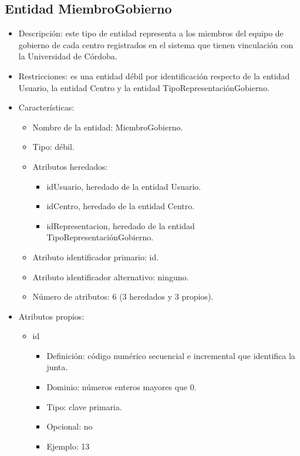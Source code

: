 \subsection{Entidad MiembroGobierno}
\begin{itemize}
    \item Descripción: este tipo de entidad representa a los miembros del equipo de gobierno de cada centro registrados en el sistema que tienen vinculación con la Universidad de Córdoba.
    \item Restricciones: es una entidad débil por identificación respecto de la entidad Usuario, la entidad Centro y la entidad TipoRepresentaciónGobierno.
    \item Características:
    \begin{itemize}
        \item Nombre de la entidad: MiembroGobierno.
        \item Tipo: débil.
        \item Atributos heredados: 
        \begin{itemize}
            \item idUsuario, heredado de la entidad Usuario.
            \item idCentro, heredado de la entidad Centro.
            \item idRepresentacion, heredado de la entidad TipoRepresentaciónGobierno.
        \end{itemize} 
        \item Atributo identificador primario: id.
        \item Atributo identificador alternativo: ninguno.
        \item Número de atributos: 6 (3 heredados y 3 propios).
    \end{itemize}

    \item Atributos propios:
    \begin{itemize}
        \item id
        \begin{itemize}
            \item Definición: código numérico secuencial e incremental que identifica la junta.
            \item Dominio: números enteros mayores que 0.
            \item Tipo: clave primaria.
            \item Opcional: no
            \item Ejemplo: 13
        \end{itemize}


\end{itemize}
\end{itemize}
